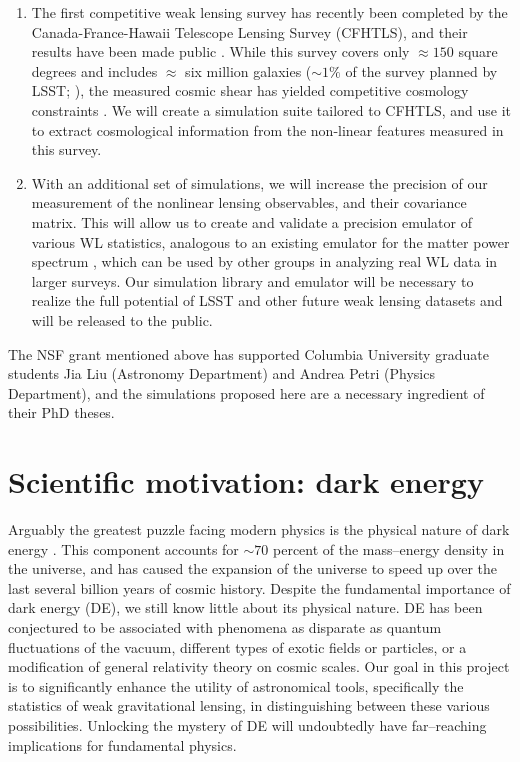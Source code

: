 \documentclass[10pt, preprint]{aastex}
\begin{document}
\begin{enumerate}

\item The first competitive weak lensing survey has recently been
  completed by the Canada-France-Hawaii Telescope Lensing Survey
  (CFHTLS), and their results have been made public
  \citep{CFHTLS2012}.  While this survey covers only $\approx 150$
  square degrees and includes $\approx$ six million galaxies
  ($\sim1\%$ of the survey planned by LSST; \citealt{LSSTbook}), the
  measured cosmic shear has yielded competitive cosmology constraints
  \citep{Kilbinger2013}.  We will create a simulation suite tailored
  to CFHTLS, and use it to extract cosmological information from the
  non-linear features measured in this survey.

\item With an additional set of simulations, we will increase the
  precision of our measurement of the nonlinear lensing observables,
  and their covariance matrix.  This will allow us to create and
  validate a precision emulator of various WL statistics, analogous to
  an existing emulator for the matter power spectrum \citep{CoyoteII},
  which can be used by other groups in analyzing real WL data in
  larger surveys.  Our simulation library and emulator will be
  necessary to realize the full potential of LSST and other future
  weak lensing datasets and will be released to the public.

\end{enumerate}

The NSF grant mentioned above has supported Columbia University
graduate students Jia Liu (Astronomy Department) and Andrea Petri
(Physics Department), and the simulations proposed here are a
necessary ingredient of their PhD theses.


\section{Scientific motivation: dark energy}

Arguably the greatest puzzle facing modern physics is the physical
nature of dark energy \citep{Tetal03}. This component accounts for
$\sim 70$ percent of the mass--energy density in the universe, and has
caused the expansion of the universe to speed up over the last several
billion years of cosmic history. Despite the fundamental importance of
dark energy (DE), we still know little about its physical nature.  DE
has been conjectured to be associated with phenomena as disparate as
quantum fluctuations of the vacuum, different types of exotic fields
or particles, or a modification of general relativity theory on cosmic
scales.  Our goal in this project is to significantly enhance the
utility of astronomical tools, specifically the statistics of weak
gravitational lensing, in distinguishing between these various
possibilities.  Unlocking the mystery of DE will undoubtedly have
far--reaching implications for fundamental physics.
\end{document}
